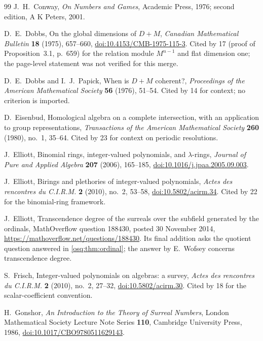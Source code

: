 \documentclass[11pt,letterpaper]{article}
\numberwithin{equation}{section}
\theoremstyle{definition}
\theoremstyle{remark}
\theoremstyle{plain}
\begin{document}
\begin{thebibliography}{99}
J.~H.~Conway, \emph{On Numbers and Games}, Academic Press, 1976; second edition, A K Peters, 2001.

D.~E.~Dobbs, On the global dimensions of $D+M$, \emph{Canadian Mathematical Bulletin} \textbf{18} (1975), 657--660,
\href{https://doi.org/10.4153/CMB-1975-115-3}{doi:10.4153/CMB-1975-115-3}. Cited by 17 (proof of Proposition~3.1, p.~659) for the relation
module $M^{n-1}$ and flat dimension one; the page-level statement was not verified for this merge.

D.~E.~Dobbs and I.~J.~Papick, When is $D+M$ coherent?, \emph{Proceedings of the American Mathematical
Society} \textbf{56} (1976), 51--54. Cited by 14 for context; no criterion is imported.

D.~Eisenbud, Homological algebra on a complete intersection, with an application to group representations, \emph{Transactions of the
American Mathematical Society} \textbf{260} (1980), no.~1, 35--64. Cited by 23 for context on periodic resolutions.

J.~Elliott, Binomial rings, integer-valued polynomials, and $\lambda$-rings, \emph{Journal of Pure
and Applied Algebra} \textbf{207} (2006), 165--185,
\href{https://doi.org/10.1016/j.jpaa.2005.09.003}{doi:10.1016/j.jpaa.2005.09.003}.

J.~Elliott, Birings and plethories of integer-valued polynomials, \emph{Actes des rencontres du C.I.R.M.} \textbf{2} (2010), no.~2, 53--58,
\href{https://doi.org/10.5802/acirm.34}{doi:10.5802/acirm.34}. Cited by 22 for the binomial-ring framework.

J.~Elliott, Transcendence degree of the surreals over the subfield generated by the ordinals,
MathOverflow question 188430, posted 30 November 2014,
\url{https://mathoverflow.net/questions/188430}. Its final addition asks the quotient question
answered in \cref{osq:thm:ordinal}; the answer by E.~Wofsey concerns transcendence degree.

S.~Frisch, Integer-valued polynomials on algebras: a survey, \emph{Actes des rencontres du C.I.R.M.} \textbf{2} (2010), no.~2, 27--32,
\href{https://doi.org/10.5802/acirm.30}{doi:10.5802/acirm.30}. Cited by 18 for the scalar-coefficient convention.

H.~Gonshor, \emph{An Introduction to the Theory of Surreal Numbers}, London Mathematical Society
Lecture Note Series \textbf{110}, Cambridge University Press, 1986,
\href{https://doi.org/10.1017/CBO9780511629143}{doi:10.1017/CBO9780511629143}.


\end{thebibliography}
\end{document}
